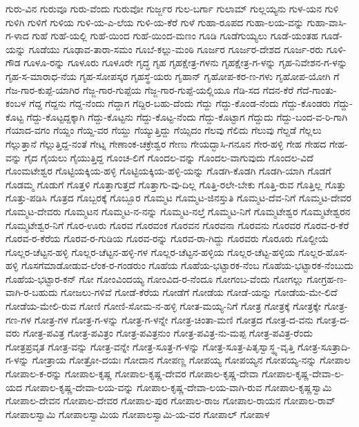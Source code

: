 ಗುರು-ವಿನ
ಗುರುವೂ
ಗುರು-ವೆಂದು
ಗುರುವೋ
ಗುರ್ಜ್ಜರ
ಗುಲ-ಬರ್ಗಾ
ಗುಲಾಮ್
ಗುಲ್ಲಯ್ಯನು
ಗುಳ-ಯನ
ಗುಳಿ
ಗುಳಿಗಿ
ಗುಳಿಗೆ
ಗುಳಿಯ
ಗುಳಿ-ಯ-ಎ-ಲೆಯ
ಗುಳಿ-ಯ-ಕೆರೆ
ಗುಳೆ
ಗುಹಾ-ರೂಪದ
ಗುಹಾ-ಲಯ-ವನ್ನು
ಗುಹಾ-ವಾಸಿ-ಗ-ಳಾದ
ಗುಹೆ
ಗುಹೆ-ಯಲ್ಲಿ
ಗುಹೆ-ಯಿಂದ
ಗುಹೆ-ಯಿಂದ-ಮಣಂ
ಗೂಡಿ
ಗೂಡೆಗುಯ್ಯಲು
ಗೂಡೆ-ಯಂತಹ
ಗೂಡೆ-ಯನ್ನು
ಗೂಡೆಯು
ಗೂಢಾವ-ತಾರಾ-ಸಮಂ
ಗೂಬೆ-ಕಲ್ಲು-ಮಂಠಿ
ಗೂರ್ಜರ
ಗೂರ್ಜರ-ದೇಶದ
ಗೂರ್ಜ-ರರು
ಗೂಳಿ-ಗೌಡ
ಗೂಳೂ-ರನ್ನು
ಗೂಳೂರು
ಗೂಳೂರೇ
ಗೃದ್ಧ
ಗೃಹ
ಗೃಹಕ್ಷೇತ್ರ-ಗಳನು
ಗೃಹಕ್ಷೇತ್ರ-ಗ-ಳನ್ನು
ಗೃಹ-ನಿವೇಶನ-ಗ-ಳನ್ನು
ಗೃಹ-ಸ-ಮಾರಾಧ-ನೆಯ
ಗೃಹ-ಸೋಪಸ್ಕರ
ಗೃಹಸ್ಥೆ-ಯರು
ಗೃಹಾನ್
ಗೃಹೋಪ-ಕರ-ಣ-ಗಳು
ಗೃಹೋಪ-ಯೋಗಿ
ಗೆ
ಗೆಜ-ಗಾರ-ಕುಪ್ಪೆ-ಯಾಗಿರ
ಗೆಜ್ಜ-ಗಾರ-ಗುಪ್ಪೆಯ
ಗೆಜ್ಜ-ಗಾರ-ಗುಪ್ಪೆ-ಯಲ್ಲಿಯೂ
ಗೆಡಿ-ಸದ
ಗೆದನ-ಕೆರೆ
ಗೆದೆ-ಗಾಂತು-ಕಂಬಳ
ಗೆದ್ದ
ಗೆದ್ದನು
ಗೆದ್ದ-ನೆಂದು
ಗೆದ್ದಾಗ
ಗೆದ್ದಿರ-ಬಹು-ದೆಂದು
ಗೆದ್ದು
ಗೆದ್ದು-ಕೊಂಡ-ನೆಂದು
ಗೆದ್ದು-ಕೊಂಡರು
ಗೆದ್ದು-ಕೊಟ್ಟ
ಗೆದ್ದು-ಕೊಟ್ಟದ್ದಕ್ಕಾಗಿ
ಗೆದ್ದು-ಕೊಟ್ಟನು
ಗೆದ್ದು-ಕೊಟ್ಟ-ನೆಂದು
ಗೆದ್ದು-ಕೊಟ್ಟಾಗ
ಗೆದ್ದುದು
ಗೆದ್ದು-ಬಂದ-ವ-ರಿ-ಗಾಗಿ
ಗೆಯಾದ-ವಗಂ
ಗೆಯ್ದಂ
ಗೆಯ್ದ-ವರ
ಗೆಯ್ದು
ಗೆಯ್ಯುತ್ತಿದ್ದು
ಗೆಯ್ಸಿದಂ
ಗೆಲವು
ಗೆಲಿದು
ಗೆಲುವು
ಗೆಲ್ದಡೆ
ಗೆಲ್ಲಲು
ಗೆಲ್ಲುತ್ತಾನೆ
ಗೆಲ್ಲುತ್ತಿದ್ದ-ನಂತೆ
ಗೇಟ್ನ
ಗೇಣಾಂಕ-ಚಕ್ರೇಶ್ವರ
ಗೇಣು
ಗೇಯದ್ಭಾಸಿ-ಗನೂನ
ಗೇರ-ಹಳ್ಳಿ
ಗೇಹ
ಗೇಹದ
ಗೇಹ-ವನ್ನು
ಗೈದ
ಗೈಯಲು
ಗೈಯುತ್ತಿದ್ದ
ಗೊಂಚ-ಲಿಗೆ
ಗೊಂದಲ-ವನ್ನು
ಗೊಂದಲ-ವಾಗುವುದು
ಗೊಂದಲ-ವಿದೆ
ಗೊಂಮಟೇಶ್ವರ
ಗೊಟ್ಟಿಯಕ್ಕಿಯ-ಹಳ್ಳಿ
ಗೊಟ್ಟಿಯಕ್ಕಿಯ-ಹಳ್ಳಿ-ಯನ್ನು
ಗೊಡಗಿ-ಕೊಡಗಿ
ಗೊಡಗಿ-ಯಾಗಿ
ಗೊಡಗೆ
ಗೊಡಮ್ಮ
ಗೊಡುಗೆ
ಗೊತ್ತಳಿ
ಗೊತ್ತಾಗುತ್ತದೆ
ಗೊತ್ತಾಗು-ವು-ದಿಲ್ಲ
ಗೊತ್ತಿ-ರಲೇ-ಬೇಕು
ಗೊತ್ತಿ-ರುವ
ಗೊತ್ತಿಲ್ಲ
ಗೊತ್ತು
ಗೊತ್ತು-ಪಡಿಸಿ
ಗೊತ್ರದ
ಗೊಬ್ಬರಕ್ಕೆ
ಗೊಬ್ಬೂರ
ಗೊಮ್ಮಟ
ಗೊಮ್ಮಟ-ಜಿನಸ್ತುತಿ
ಗೊಮ್ಮಟ-ದೆವ-ನಿಗೆ
ಗೊಮ್ಮಟ-ದೇವರ
ಗೊಮ್ಮಟ-ದೇವರು
ಗೊಮ್ಮಟನ
ಗೊಮ್ಮಟ-ನ-ನನ್ನು
ಗೊಮ್ಮಟ-ನಲ್ತೆ
ಗೊಮ್ಮಟ-ನಿಗೆ
ಗೊಮ್ಮಟೇಶ್ವರ
ಗೊಮ್ಮಟೇಶ್ವರನ
ಗೊಮ್ಮಟೇಶ್ವರ-ನಿಗೆ
ಗೊರ-ಊರು
ಗೊರವ
ಗೊರವಂಕ
ಗೊರವನ
ಗೊರವನಾ
ಗೊರವನು
ಗೊರವರ
ಗೊರವ-ರ-ಕೆರೆ
ಗೊರವ-ರ-ಕೆರೆಯ
ಗೊರವ-ರ-ಗುಡಿಯ
ಗೊರವ-ರನ್ನು
ಗೊರವ-ರಾ-ಗಿದ್ದು
ಗೊರವರು
ಗೊರೂರು
ಗೊಲ್ದೀಯೆ
ಗೊಲ್ಲರ-ಚೆಟ್ಟನ-ಹಳ್ಳಿ
ಗೊಲ್ಲರ-ಚೆಟ್ಟನ-ಹಳ್ಳಿ-ಗಳ
ಗೊಲ್ಲರ-ಚೆಟ್ಟನ-ಹಳ್ಳಿಯ
ಗೊಲ್ಲರ-ಚೆಟ್ಟ-ಹಳ್ಳಿಯ
ಗೊಲ್ಲರ-ಹೊಸ-ಹಳ್ಳಿ
ಗೊಸಗೆಮಾಡೋಡುವ-ಲೆಂಕ-ರ-ಗಂಡರುಂ
ಗೊಹೆಯ
ಗೊಹೆಯ-ಭಟ್ಟಾರಕ-ನೆಂಬ
ಗೊಹೆಯ-ಭಟ್ಟಾರಕ-ನೆಂಬುದು
ಗೊಹೆಯ-ಭಟ್ಟಾರ-ಕನ್
ಗೋ
ಗೋಂವಿಂದಯ್ಯ
ಗೋಂವಿದ-ರ-ನೆಂದೂ
ಗೋಗಂಬ-ವೆಂದು
ಗೋಗಲ್ಲು
ಗೋಗ್ರಹ-ಣ-ವಾಗಿ-ರ-ಬಹುದು
ಗೋಜಲು-ಗಳಿವೆ
ಗೋಡೆ-ಕೆರೆಯ
ಗೋಡೆಗೆ
ಗೋಡೆಯ
ಗೋಡೆ-ಯನ್ನು
ಗೋಡೆಯ-ಮೇ-ಲಿದೆ
ಗೋಡೆಯ-ಮೇಲಿ-ರುವ
ಗೋಣಿ
ಗೋಣಿ-ಸೋಮ-ನ-ಹಳ್ಳಿ
ಗೋತ-ಮಯ್ಯ-ನಿಗೆ
ಗೋತ್ರ
ಗೋತ್ರಕ್ಕೆ
ಗೋತ್ರಕ್ಕೇ
ಗೋತ್ರ-ಗಣ-ಗಳ
ಗೋತ್ರ-ಗಳ
ಗೋತ್ರ-ಗ-ಳನ್ನು
ಗೋತ್ರ-ಗ-ಳನ್ನೇ
ಗೋತ್ರ-ಚಿಂತಾ-ಮಣಿ
ಗೋತ್ರದ
ಗೋತ್ರ-ದ-ವನು
ಗೋತ್ರ-ದ-ವರು
ಗೋತ್ರ-ಪವಿತ್ರ
ಗೋತ್ರ-ಪವಿತ್ರಂ
ಗೋತ್ರ-ಪವಿತ್ರನುಂ
ಗೋತ್ರ-ಪವಿತ್ರ-ನು-ಮಪ್ಪ
ಗೋತ್ರ-ಪವಿತ್ರ-ರೆಂದು
ಗೋತ್ರಪ್ರವೃತ
ಗೋತ್ರ-ವನ್ನು
ಗೋತ್ರ-ವನ್ನೇ
ಗೋತ್ರ-ಸೂತ್ರ-ಗ-ಳನ್ನು
ಗೋತ್ರ-ಸೂತ್ರ-ಪಿತೃಸ್ವಾಸ್ಥ್ಯ-ವೃತ್ತಿ
ಗೋತ್ರ-ಸೂತ್ರಾದಿ-ಗ-ಳನ್ನು
ಗೋತ್ರಾಯ
ಗೋತ್ರೋ-ದಯಃ
ಗೋದಾನ
ಗೋಪಣ್ಣ
ಗೋಪಯ್ಯ
ಗೋಪಯ್ಯನ
ಗೋಪಯ್ಯ-ನನ್ನು
ಗೋಪಾಲ
ಗೋಪಾಲ-ಕ-ರನ್ನು
ಗೋಪಾಲ-ಕೃಷ್ಣ
ಗೋಪಾಲ-ಕೃಷ್ಣ-ದೇವರ
ಗೋಪಾಲ-ಕೃಷ್ಣ-ದೇವಾ
ಗೋಪಾಲ-ಕೃಷ್ಣ-ದೇವಾ-ಲ-ಯದ
ಗೋಪಾಲ-ಕೃಷ್ಣ-ದೇವಾ-ಲಯ-ವನ್ನು
ಗೋಪಾಲ-ಕೃಷ್ಣ-ದೇವಾ-ಲಯ-ವಾಗಿ-ರುವ
ಗೋಪಾಲ-ಕೃಷ್ಣಸ್ವಾಮಿ
ಗೋಪಾಲ-ದೇವನ
ಗೋಪಾಲ-ದೇವರ
ಗೋಪಾಲ-ಪುರ
ಗೋಪಾಲ-ರಾಜ
ಗೋಪಾಲ-ರಾಯನ
ಗೋಪಾಲ-ರಾವ್
ಗೋಪಾಲಸ್ವಾಮಿ
ಗೋಪಾಲಸ್ವಾಮಿಯ
ಗೋಪಾಲಸ್ವಾಮಿ-ಯ-ವರ
ಗೋಪಾಲ್
ಗೋಪಾಳ
